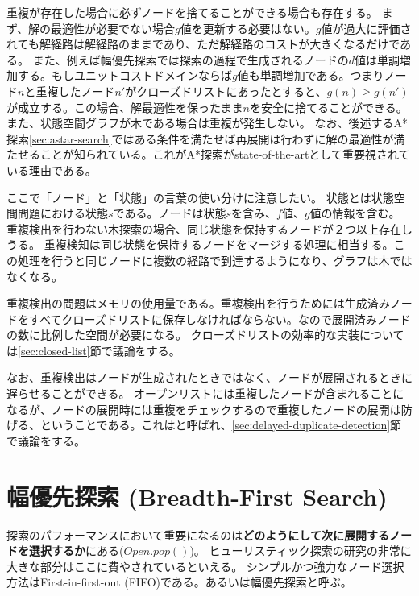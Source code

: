重複が存在した場合に必ずノードを捨てることができる場合も存在する。
まず、解の最適性が必要でない場合$g$値を更新する必要はない。$g$値が過大に評価されても解経路は解経路のままであり、ただ解経路のコストが大きくなるだけである。
また、例えば幅優先探索では探索の過程で生成されるノードの$d$値は単調増加する。もしユニットコストドメインならば$g$値も単調増加である。つまりノード$n$と重複したノード$n'$がクローズドリストにあったとすると、$g(n) \geq g(n')$が成立する。この場合、解最適性を保ったまま$n$を安全に捨てることができる。
また、状態空間グラフが木である場合は重複が発生しない。
なお、後述するA*探索\ref{sec:astar-search}ではある条件を満たせば再展開は行わずに解の最適性が満たせることが知られている。これがA*探索がstate-of-the-artとして重要視されている理由である。

ここで「ノード」と「状態」の言葉の使い分けに注意したい。
状態とは状態空間問題における状態$s$である。ノードは状態$s$を含み、$f$値、$g$値の情報を含む。
重複検出を行わない木探索の場合、同じ状態を保持するノードが２つ以上存在しうる。
重複検知は同じ状態を保持するノードをマージする処理に相当する。この処理を行うと同じノードに複数の経路で到達するようになり、グラフは木ではなくなる。

重複検出の問題はメモリの使用量である。重複検出を行うためには生成済みノードをすべてクローズドリストに保存しなければならない。なので展開済みノードの数に比例した空間が必要になる。
クローズドリストの効率的な実装については\ref{sec:closed-list}節で議論をする。

なお、重複検出はノードが生成されたときではなく、ノードが展開されるときに遅らせることができる。
オープンリストには重複したノードが含まれることになるが、ノードの展開時には重複をチェックするので重複したノードの展開は防げる、ということである。これはと呼ばれ、\ref{sec:delayed-duplicate-detection}節で議論をする。



\section{幅優先探索 (Breadth-First Search)}
\label{sec:breadth-first-search}

探索のパフォーマンスにおいて重要になるのは{\bf どのようにして次に展開するノードを選択するか}にある($Open.pop()$)。
ヒューリスティック探索の研究の非常に大きな部分はここに費やされているといえる。
シンプルかつ強力なノード選択方法はFirst-in-first-out (FIFO)である。あるいは幅優先探索と呼ぶ。

